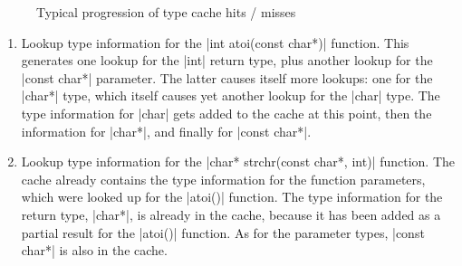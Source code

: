 \begin{figure}[thH]
  \centering
  \caption{Typical progression of type cache hits / misses}
  \label{fig:plot-type-cache-hitmiss}
\end{figure}

\begin{enumerate}

  \item Lookup type information for the \Mc|int atoi(const char*)| function.
  This generates one lookup for the \Mc|int| return type, plus another lookup
  for the \Mc|const char*| parameter. The latter causes itself more lookups:
  one for the \Mc|char*| type, which itself causes yet another lookup for the
  \Mc|char| type. The type information for \Mc|char| gets added to the
  cache at this point, then the information for \Mc|char*|, and finally for
  \Mc|const char*|.

  \item Lookup type information for the \Mc|char* strchr(const char*, int)|
  function. The cache already contains the type information for the function
  parameters, which were looked up for the \Mc|atoi()| function. The type
  information for the return type, \Mc|char*|, is already in the cache,
  because it has been added as a partial result for the \Mc|atoi()|
  function. As for the parameter types, \Mc|const char*| is also
  in the cache.

\end{enumerate}

